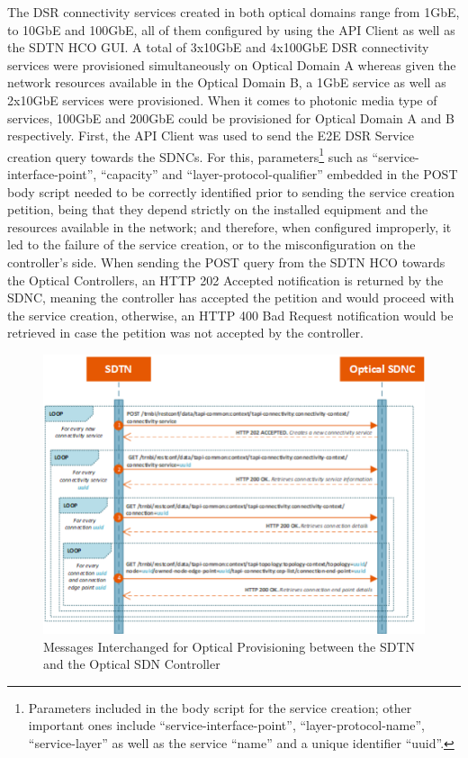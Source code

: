 \documentclass[a4paper,fleqn]{cas-dc}
\begin{document}
The DSR connectivity services created in both optical domains range from 1GbE, to 10GbE and 100GbE, all of them configured by using the API Client as well as the SDTN HCO GUI. A total of 3x10GbE and 4x100GbE DSR connectivity services were provisioned simultaneously on Optical Domain A whereas given the network resources available in the Optical Domain B, a 1GbE service as well as 2x10GbE services were provisioned. When it comes to photonic media type of services, 100GbE and 200GbE could be provisioned for Optical Domain A and B respectively. 
First, the API Client was used to send the E2E DSR Service creation query towards the SDNCs. For this, parameters\footnote{Parameters included in the body script for the service creation; other important ones include “service-interface-point”, “layer-protocol-name”, “service-layer” as well as the service “name” and a unique identifier “uuid”.} such as “service-interface-point”, “capacity” and “layer-protocol-qualifier” embedded in the POST body script needed to be correctly identified prior to sending the service creation petition, being that they depend strictly on the installed equipment and the resources available in the network; and therefore, when configured improperly, it led to the failure of the service creation, or to the misconfiguration on the controller’s side. When sending the POST query from the SDTN HCO towards the Optical Controllers, an HTTP 202 Accepted notification is returned by the SDNC, meaning the controller has accepted the petition and would proceed with the service creation, otherwise, an HTTP 400 Bad Request notification would be retrieved in case the petition was not accepted by the controller. 

\begin{figure}
	\centering
		\includegraphics[width=\linewidth]{figs/optical_provisioning_workflow_2.png}
	\caption{Messages Interchanged for Optical Provisioning between the SDTN and the Optical SDN Controller}
	\label{FIG:optical_provisioning_workflow}
\end{figure}
\end{document}

